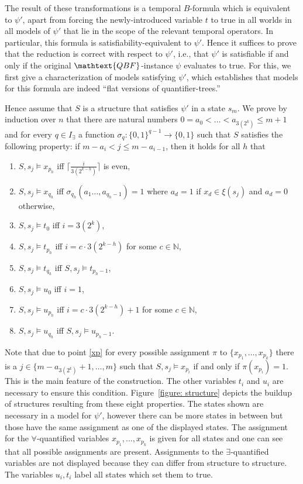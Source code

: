         The result of these transformations is a temporal $B$-formula which is equivalent to $\psi'$, apart from forcing the newly-introduced variable $t$ to true in all worlds in all models of $\psi'$ that lie in the scope of the relevant temporal operators. In particular, this formula is satisfiability-equivalent to $\psi'$. Hence it suffices to prove that the reduction is correct with respect to $\psi'$, i.e., that $\psi'$ is satisfiable if and only if the original $\mathtext{QBF}$-instance $\psi$ evaluates to true. For this, we first give a characterization of models satisfying $\psi'$, which establishes that models for this formula are indeed ``flat versions of quantifier-trees.''

        Hence assume that $S$ is a structure that satisfies $\psi'$ in a state $s_m$. We prove by induction over $n$ that there are natural numbers $0=a_0<\dots<a_{3(2^k)}\leq m+1$ and for every $q\in I_{\exists}$ a function $\sigma_q:\{0,1\}^{q-1}\rightarrow\{0,1\}$ such that $S$ satisfies the following property: if $m-a_i<j\leq m-a_{i-1}$, then it holds for all $h$ that


        \begin{enumerate}[(1)]
\item\label{xp} $S,s_j\vDash x_{p_h}$  iff  $\lceil\frac{i}{3(2^{k-h})}\rceil$ is even,
          \item\label{xq} $S,s_j\vDash x_{q_h}$  iff  $\sigma_{q_h}(a_1\dots,a_{q_h-1})=1$ where $a_d=1$ if $x_d\in\xi(s_j)$ and $a_d=0$ otherwise,
\item $S,s_j\vDash t_0$      iff  $i=3(2^k)$,
          \item $S,s_j\vDash t_{p_h}$  iff  $i=c\cdot 3(2^{k-h})$ for some $c\in\mathbb{N}$,\
          \item $S,s_j\vDash t_{q_h}$  iff  $S,s_j\vDash t_{p_h-1}$,
          \item $S,s_j\vDash u_0$      iff  $i=1$,
          \item $S,s_j\vDash u_{p_h}$  iff  $i=c\cdot 3(2^{k-h})+1$ for some $c\in\mathbb{N}$,
          \item $S,s_j\vDash u_{q_h}$  iff  $S,s_j\vDash u_{p_h-1}$.
        \end{enumerate}

	Note that due to point \ref{xp} for every possible assignment $\pi$ to $\{x_{p_1},\dots,x_{p_k}\}$ there is a $j\in\{m\!-\!a_{3(2^k)}\!+\!1,\dots,m\}$ such that $S,s_j\vDash x_{p_i}$ if and only if $\pi(x_{p_i})=1$. This is the main feature of the construction. The other variables $t_i$ and $u_i$ are necessary to ensure this condition. Figure~\ref{figure: structure} depicts the buildup of structures resulting from these eight properties. The states shown are necessary in a model for $\psi'$, however there can be more states in between but those have the same assignment as one of the displayed states. The assignment for the $\forall$-quantified variables $x_{p_1},\dots,x_{p_k}$ is given for all states and one can see that all possible assignments are present. Assignments to the $\exists$-quantified variables are not displayed because they can differ from structure to structure. The variables $u_i,t_i$ label all states which set them to true.

